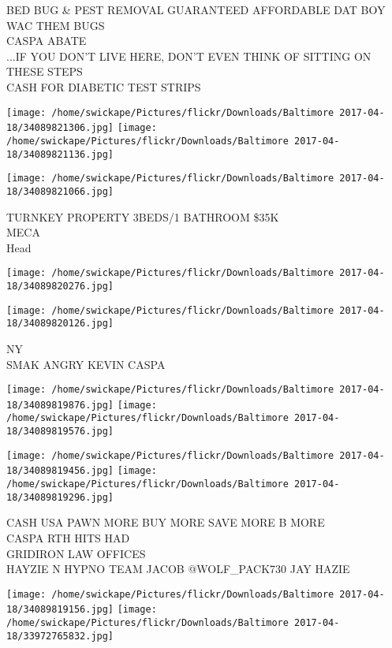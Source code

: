 \documentclass[10pt,letterpaper]{article}
\begin{document}
BED BUG \& PEST REMOVAL GUARANTEED AFFORDABLE DAT BOY WAC THEM BUGS\\
CASPA ABATE\\
...IF YOU DON'T LIVE HERE, DON'T EVEN THINK OF SITTING ON THESE STEPS\\
CASH FOR DIABETIC TEST STRIPS
\pagebreak

\texttt{[image: /home/swickape/Pictures/flickr/Downloads/Baltimore 2017-04-18/34089821306.jpg]}
\texttt{[image: /home/swickape/Pictures/flickr/Downloads/Baltimore 2017-04-18/34089821136.jpg]}

\vspace{0.25in}
\texttt{[image: /home/swickape/Pictures/flickr/Downloads/Baltimore 2017-04-18/34089821066.jpg]}

TURNKEY PROPERTY 3BEDS/1 BATHROOM \$35K\\
MECA\\
Head
\pagebreak

\texttt{[image: /home/swickape/Pictures/flickr/Downloads/Baltimore 2017-04-18/34089820276.jpg]}

\vspace{0.25in}
\texttt{[image: /home/swickape/Pictures/flickr/Downloads/Baltimore 2017-04-18/34089820126.jpg]}

NY\\
SMAK ANGRY KEVIN CASPA
\pagebreak

\texttt{[image: /home/swickape/Pictures/flickr/Downloads/Baltimore 2017-04-18/34089819876.jpg]}
\texttt{[image: /home/swickape/Pictures/flickr/Downloads/Baltimore 2017-04-18/34089819576.jpg]}

\texttt{[image: /home/swickape/Pictures/flickr/Downloads/Baltimore 2017-04-18/34089819456.jpg]}
\texttt{[image: /home/swickape/Pictures/flickr/Downloads/Baltimore 2017-04-18/34089819296.jpg]}

CASH USA PAWN MORE BUY MORE SAVE MORE B MORE\\
CASPA RTH HITS HAD\\
GRIDIRON LAW OFFICES\\
HAYZIE N HYPNO TEAM JACOB @WOLF\_PACK730 JAY HAZIE
\pagebreak

\texttt{[image: /home/swickape/Pictures/flickr/Downloads/Baltimore 2017-04-18/34089819156.jpg]}
\texttt{[image: /home/swickape/Pictures/flickr/Downloads/Baltimore 2017-04-18/33972765832.jpg]}
\end{document}
